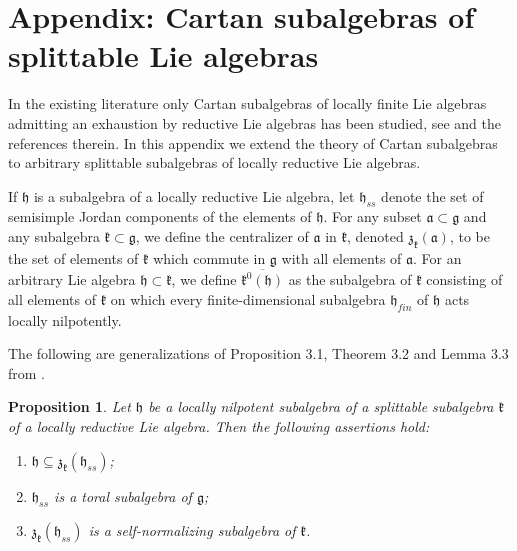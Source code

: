 \documentclass{article}
\def\a{\mathfrak {a}}
\def\h{\mathfrak {h}}
\def\g{\mathfrak {g}}
\def\z{\mathfrak {z}}
\def\k{\mathfrak{k}}
\newtheorem{prop}[thm]{Proposition}
\begin{document}
\appendix

\section{Appendix: Cartan subalgebras of splittable Lie algebras}


In the existing literature only Cartan subalgebras of locally finite Lie algebras admitting an exhaustion by reductive Lie algebras has been studied, see \cite{DPS} and the references therein. In this appendix we extend the theory of Cartan subalgebras to arbitrary splittable subalgebras of locally reductive Lie algebras. 

If $\h$ is a subalgebra of a locally reductive Lie algebra, let $\h_{ss}$ denote the set of semisimple Jordan components of the elements of $\h$.
For any subset $\a \subset \g$ and any subalgebra $\k \subset \g$, we define the centralizer of $\a$ in $\k$, denoted $\z_\k (\a)$, to be the set of elements of $\k$ which commute in $\g$ with all elements of $\a$.
For an arbitrary Lie algebra $\h \subset \k$, we define $\overline{\k^0(\h)}$ as the subalgebra of $\k$ consisting of all elements of $\k$ on which every finite-dimensional subalgebra $\h_{fin}$ of $\h$ acts locally nilpotently.

The following are generalizations of Proposition 3.1, Theorem 3.2 and Lemma 3.3 from \cite{DPS}.   


\begin{prop} \label{centralizer}
Let $\h$ be a locally nilpotent subalgebra of a splittable subalgebra $\k$ of a locally reductive Lie
algebra.  Then the following assertions hold:
\begin{enumerate}
\item $\h \subseteq \z_\k(\h_{ss})$;
\item \label{toral} $\h_{ss}$ is a toral subalgebra of $\g$;
\item  \label{self-normalizing} $\z_\k (\h_{ss})$ is a self-normalizing subalgebra of $\k$.
\end{enumerate}
\end{prop}
\end{document}
